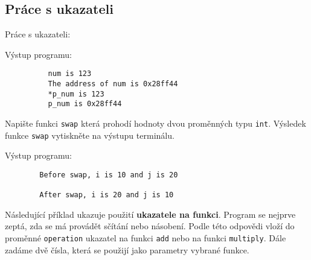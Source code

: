     \subsection{Práce s ukazateli}  
  
      \begin{example} Práce s ukazateli:\label{CPP:ex_pointer1}
      
      Výstup programu:
        \begin{verbatim}
          num is 123
          The address of num is 0x28ff44
          *p_num is 123
          p_num is 0x28ff44
          \end{verbatim}
      \end{example}
      
      \begin{example}\label{CPP:ex_swap} Napište funkci \texttt{swap} která prohodí hodnoty dvou 
      proměnných typu \texttt{int}. Výsledek funkce \texttt{swap} vytiskněte na výstupu terminálu.
      
      Výstup programu:
        \begin{verbatim}
        Before swap, i is 10 and j is 20
        
        After swap, i is 20 and j is 10
        \end{verbatim}
      \end{example}
      
      \begin{example}\label{CPP:ex_scitej_nasob} Následující příklad ukazuje použití 
      \textbf{ukazatele na funkci}. Program se nejprve zeptá, zda se má provádět sčítání nebo 
      násobení. Podle této odpovědi vloží do proměnné \texttt{operation} ukazatel na funkci 
      \texttt{add} nebo na funkci \texttt{multiply}. Dále zadáme dvě čísla, která se použijí jako 
      parametry vybrané funkce.
      
      \end{example}             
  
